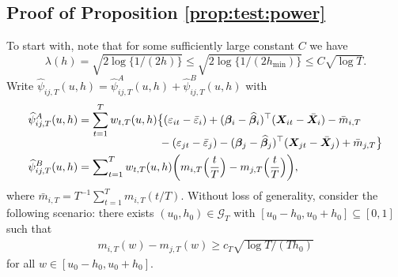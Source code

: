 \documentclass[12pt]{article}
\begin{document}
\subsection*{Proof of Proposition \ref{prop:test:power}}


To start with, note that for some sufficiently large constant $C$ we have
\begin{equation}\label{eqA:power:lambda}
\lambda(h) = \sqrt{2\log\{1/(2h)\}} \le \sqrt{2\log\{1/(2h_{\min})\}} \le C \sqrt{\log T}.
\end{equation}
Write $\widehat{\psi}_{ij, T}(u,h) = \widehat{\psi}_{ij, T}^A(u,h) + \widehat{\psi}_{ij, T}^B(u,h)$ with 
\begin{align*}
\widehat{\psi}^A_{ij,T}(u,h) &= \sum_{t=1}^T w_{t,T}(u,h) \big\{ (\varepsilon_{it} - \bar{\varepsilon}_i) + (\bm{\beta}_i - \widehat{\bm{\beta}}_i)^\top (\boldsymbol{X}_{it} - \bar{\boldsymbol{X}}_{i}) - \bar{m}_{i, T} \\*[-0.2cm]
& \qquad \qquad \qquad \quad \ - (\varepsilon_{jt} - \bar{\varepsilon}_j) -  (\bm{\beta}_j - \widehat{\bm{\beta}}_j)^\top (\boldsymbol{X}_{jt} - \bar{\boldsymbol{X}}_{j}) + \bar{m}_{j, T} \big\} \\
\widehat{\psi}_{ij, T}^B(u,h) &= \sum\nolimits_{t=1}^T w_{t,T}(u,h) \bigg(m_{i, T}\Big(\frac{t}{T}\Big) - m_{j, T}\Big(\frac{t}{T}\Big) \bigg),
\end{align*}
where $\bar{m}_{i, T} = T^{-1} \sum_{t=1}^T m_{i, T} (t/T)$. Without loss of generality, consider the following scenario: there exists $(u_0,h_0) \in \mathcal{G}_T$ with $[u_0-h_0,u_0+h_0] \subseteq [0,1]$ such that \begin{align}\label{eqA:power2}
m_{i,T}(w) - m_{j,T}(w) \ge c_T \sqrt{\log T/(Th_0)}
\end{align}
for all $w \in [u_0-h_0,u_0+h_0]$. 
\end{document}
